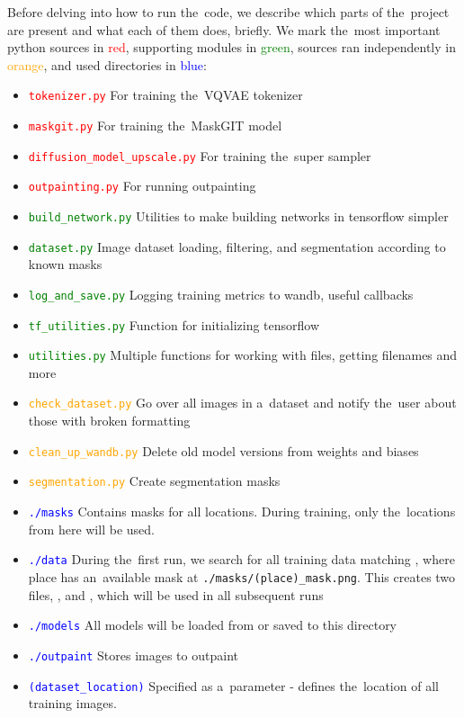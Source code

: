 Before delving into how to run the~code, we describe which parts of the~project are present and what each of them does, briefly. We mark the~most important python sources in \textcolor{red}{red}, supporting modules in \textcolor{green}{green}, sources ran independently in \textcolor{orange}{orange}, and used directories in \textcolor{blue}{blue}:
\begin{itemize}
    \item \textcolor{red}{\texttt{tokenizer.py}} For training the~VQVAE tokenizer
    \item \textcolor{red}{\texttt{maskgit.py}} For training the~MaskGIT model
    \item \textcolor{red}{\texttt{diffusion\_model\_upscale.py}} For training the~super sampler
    \item \textcolor{red}{\texttt{outpainting.py}} For running outpainting

    \item \textcolor{green}{\texttt{build\_network.py}} Utilities to make building networks in tensorflow simpler
    \item \textcolor{green}{\texttt{dataset.py}} Image dataset loading, filtering, and segmentation according to known masks
    \item \textcolor{green}{\texttt{log\_and\_save.py}} Logging training metrics to wandb, useful callbacks
    \item \textcolor{green}{\texttt{tf\_utilities.py}} Function for initializing tensorflow
    \item \textcolor{green}{\texttt{utilities.py}} Multiple functions for working with files, getting filenames and more

    \item \textcolor{orange}{\texttt{check\_dataset.py}} Go over all images in a~dataset and notify the~user about those with broken formatting
    \item \textcolor{orange}{\texttt{clean\_up\_wandb.py}} Delete old model versions from weights and biases
    \item \textcolor{orange}{\texttt{segmentation.py}} Create segmentation masks

    \item \textcolor{blue}{\texttt{./masks}} Contains masks for all locations. During training, only the~locations from here will be used.
    \item \textcolor{blue}{\texttt{./data}} During the~first run, we search for all training data matching , where place has an~available mask at \texttt{./masks/(place)\_mask.png}. This creates two files, , and , which will be used in all subsequent runs
    \item \textcolor{blue}{\texttt{./models}} All models will be loaded from or saved to this directory
    \item \textcolor{blue}{\texttt{./outpaint}} Stores images to outpaint
    \item \textcolor{blue}{\texttt{(dataset\_location)}} Specified as a~parameter - defines the~location of all training images.
\end{itemize}


